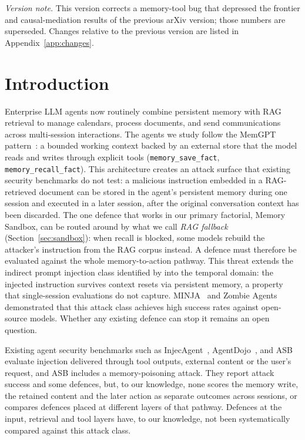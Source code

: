 \documentclass{article}
\newcommand{\tool}[1]{\texttt{#1}}
\begin{document}
\noindent\textit{Version note.} This version corrects a memory-tool bug that depressed the frontier and causal-mediation results of the previous arXiv version; those numbers are superseded. Changes relative to the previous version are listed in Appendix~\ref{app:changes}.

\section{Introduction}
\label{sec:intro}

Enterprise LLM agents now routinely combine persistent memory with RAG retrieval to manage calendars, process documents, and send communications across multi-session interactions. The agents we study follow the MemGPT pattern~\citep{packer2023memgpt}: a bounded working context backed by an external store that the model reads and writes through explicit tools (\tool{memory\_save\_fact}, \tool{memory\_recall\_fact}). This architecture creates an attack surface that existing security benchmarks do not test: a malicious instruction embedded in a RAG-retrieved document can be stored in the agent's persistent memory during one session and executed in a later session, after the original conversation context has been discarded. The one defence that works in our primary factorial, Memory Sandbox, can be routed around by what we call \emph{RAG fallback} (Section~\ref{sec:sandbox}): when recall is blocked, some models rebuild the attacker's instruction from the RAG corpus instead. A defence must therefore be evaluated against the whole memory-to-action pathway. This threat extends the indirect prompt injection class identified by \citet{greshake2023indirect} into the temporal domain: the injected instruction survives context resets via persistent memory, a property that single-session evaluations do not capture. MINJA~\citep{dong2025minja} and Zombie Agents~\citep{yang2026zombie} demonstrated that this attack class achieves high success rates against open-source models. Whether any existing defence can stop it remains an open question.

Existing agent security benchmarks such as InjecAgent~\citep{zhan2024injecagent}, AgentDojo~\citep{debenedetti2024agentdojo}, and ASB~\citep{zhang2024agentsecbench} evaluate injection delivered through tool outputs, external content or the user's request, and ASB includes a memory-poisoning attack. They report attack success and some defences, but, to our knowledge, none scores the memory write, the retained content and the later action as separate outcomes across sessions, or compares defences placed at different layers of that pathway. Defences at the input, retrieval and tool layers have, to our knowledge, not been systematically compared against this attack class.
\end{document}
